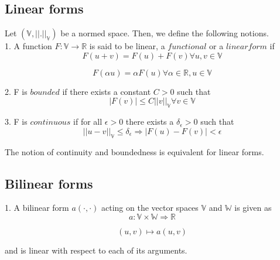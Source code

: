 \documentclass[a4paper,12pt]{book}
\begin{document}
\subsection{Linear forms}

Let $(\mathbb{V,||.||_\mathbb{V}})$ be a normed space. Then, we define the following notions.\\

1. A function $F : \mathbb{V} \rightarrow \mathbb{R}$ is said to be linear, a $functional$ or a $linear form$ if  \\

\begin{equation} 
F(u+v) = F(u) + F(v) \forall u,v \in \mathbb{V} 
\end{equation}

\begin{equation} 
F(\alpha u) = \alpha F(u) \forall \alpha \in \mathbb{R}, u \in \mathbb{V}
\end{equation}

2. F is $bounded$ if there exists a constant $C > 0$ such that\\ 
\begin{equation} 
|F(v)| \leq C ||v||_\mathbb{V} \forall v \in \mathbb{V}
\end{equation}

3. F is $continuous$ if for all $\epsilon > 0$ there exists a $\delta_\epsilon > 0$ such that \\
\begin{equation}
||u - v||_\mathbb{V} \leq \delta_\epsilon \Rightarrow  |F(u) - F(v)| < \epsilon
\end{equation}

The notion of continuity and boundedness is equivalent for linear forms.

\subsection{Bilinear forms}

1. A bilinear form $a(\cdot,\cdot)$ acting on the vector spaces $\mathbb{V}$ and $\mathbb{W}$ is given as\\
\begin{equation}
a : \mathbb{V} \times \mathbb{W} \Rightarrow \mathbb{R}
\end{equation}

\begin{equation}
(u,v) \mapsto a(u,v)
\end{equation}

and is linear with respect to each of its arguments.\\
\end{document}
